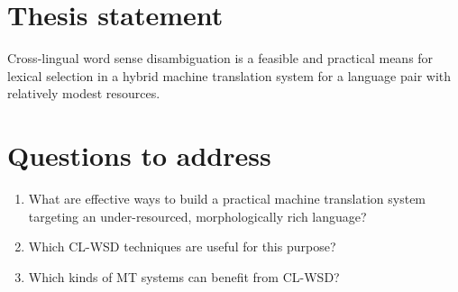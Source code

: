 
\section{Thesis statement}
Cross-lingual word sense disambiguation is a feasible and practical
means for lexical selection in a hybrid machine translation system for a
language pair with relatively modest resources.

\section{Questions to address}
\begin{enumerate}
\item What are effective ways to build a practical machine translation system
targeting an under-resourced, morphologically rich language?
\item Which CL-WSD techniques are useful for this purpose?
\item Which kinds of MT systems can benefit from CL-WSD?
\end{enumerate}
